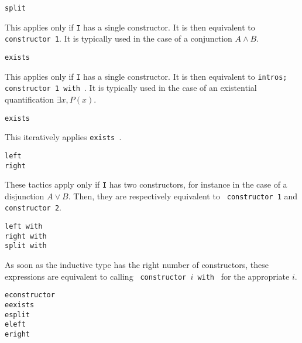 \begin{coq_example*}
\begin{Variants}
\item {\tt split}

  This applies only if {\tt I} has a single constructor. It is then
  equivalent to {\tt constructor 1}. It is typically used in the case
  of a conjunction $A\land B$.

  \ErrMsg {}

\item {\tt exists {\bindinglist}}

  This applies only if {\tt I} has a single constructor. It is then
  equivalent to {\tt intros; constructor 1 with \bindinglist}. It is
  typically used in the case of an existential quantification $\exists
  x, P(x)$.

  \ErrMsg {}

\item {\tt exists \nelist{\bindinglist}{,}}

  This iteratively applies {\tt exists {\bindinglist}}.

\item {\tt left}\\
      {\tt right}

  These tactics apply only if {\tt I} has two constructors, for instance
  in the case of a
  disjunction $A\lor B$. Then, they are respectively equivalent to {\tt
    constructor 1} and {\tt constructor 2}.

  \ErrMsg {}

\item {\tt left with \bindinglist}\\
      {\tt right with \bindinglist}\\
      {\tt split with \bindinglist}

  As soon as the inductive type has the right number of constructors,
    these expressions are equivalent to calling {\tt
    constructor $i$ with \bindinglist} for the appropriate $i$.

\item \texttt{econstructor}\\
      \texttt{eexists}\\
      \texttt{esplit}\\
      \texttt{eleft}\\
      \texttt{eright}


\end{Variants}
\end{coq_example*}
